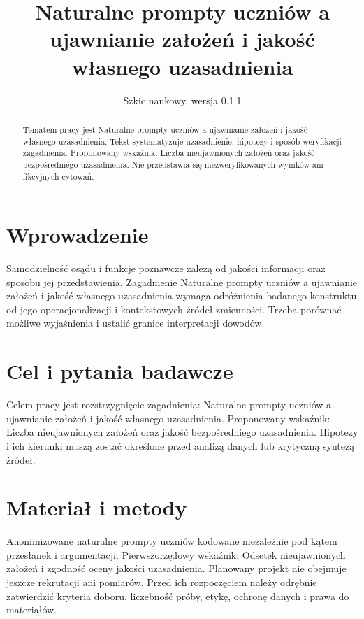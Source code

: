 \documentclass[11pt,a4paper]{article}
\title{Naturalne prompty uczniów a ujawnianie założeń i jakość własnego uzasadnienia}
\author{}
\date{Szkic naukowy, wersja 0.1.1}
\begin{document}
\maketitle

\begin{abstract}

Tematem pracy jest Naturalne prompty uczniów a ujawnianie założeń i jakość własnego uzasadnienia. Tekst systematyzuje uzasadnienie, hipotezy i sposób weryfikacji zagadnienia. Proponowany wskaźnik: Liczba nieujawnionych założeń oraz jakość bezpośredniego uzasadnienia. Nie przedstawia się niezweryfikowanych wyników ani fikcyjnych cytowań.

\end{abstract}

\section{Wprowadzenie}

Samodzielność osądu i funkcje poznawcze zależą od jakości informacji oraz sposobu jej przedstawienia. Zagadnienie Naturalne prompty uczniów a ujawnianie założeń i jakość własnego uzasadnienia wymaga odróżnienia badanego konstruktu od jego operacjonalizacji i kontekstowych źródeł zmienności. Trzeba porównać możliwe wyjaśnienia i ustalić granice interpretacji dowodów.

\section{Cel i pytania badawcze}

Celem pracy jest rozstrzygnięcie zagadnienia: Naturalne prompty uczniów a ujawnianie założeń i jakość własnego uzasadnienia. Proponowany wskaźnik: Liczba nieujawnionych założeń oraz jakość bezpośredniego uzasadnienia. Hipotezy i ich kierunki muszą zostać określone przed analizą danych lub krytyczną syntezą źródeł.

\section{Materiał i metody}

Anonimizowane naturalne prompty uczniów kodowane niezależnie pod kątem przesłanek i argumentacji. Pierwszorzędowy wskaźnik: Odsetek nieujawnionych założeń i zgodność oceny jakości uzasadnienia. Planowany projekt nie obejmuje jeszcze rekrutacji ani pomiarów. Przed ich rozpoczęciem należy odrębnie zatwierdzić kryteria doboru, liczebność próby, etykę, ochronę danych i prawa do materiałów.
\end{document}
